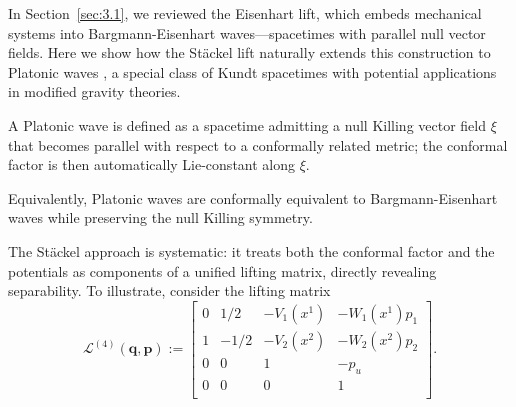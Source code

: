 \documentclass[10pt]{amsart}
\numberwithin{equation}{section}
\newcommand{\bs}{\boldsymbol}
\theoremstyle{definition}
\begin{document}
In Section~\ref{sec:3.1}, we reviewed the Eisenhart lift, which embeds mechanical systems into Bargmann-Eisenhart waves—spacetimes with parallel null vector fields. Here we show how the Stäckel lift naturally extends this construction to Platonic waves \cite[Def.~4.11]{BM2013PRD}, a special class of Kundt spacetimes with potential applications in modified gravity theories.





A Platonic wave is defined as a spacetime admitting a null Killing vector field $\xi$ that becomes parallel with respect to a conformally related metric; the conformal factor is then automatically Lie-constant along $\xi$.

Equivalently, Platonic waves are conformally equivalent to Bargmann-Eisenhart waves while preserving the null Killing symmetry.

The Stäckel approach is systematic: it treats both the conformal factor and the potentials as components of a unified lifting matrix, directly revealing separability. To illustrate, consider the lifting matrix
\begin{equation}\label{Platonic lift}
	\mathcal{L}^{(4)}(\bs{q},\bs{p}):=
	\begin{bmatrix}
		0 & 1/2 & -V_1(x^1) & -W_{1}(x^1) p_1 \\
		1 & -1/2 & -V_2(x^2)& -W_{2}(x^2) p_2 \\
		0 & 0 & 1 & - p_{u} \\
		0 & 0 & 0 & 1 \\
	\end{bmatrix}.
\end{equation}
\end{document}
